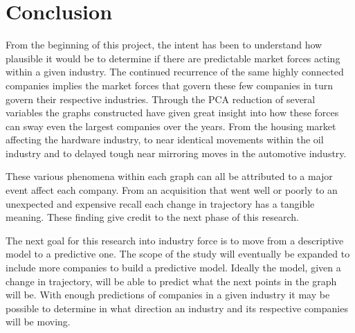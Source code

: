 \chapter{Conclusion}



	From the beginning of this project, the intent has been to understand how plausible it would be to determine if there are predictable market forces acting within a given industry. The continued recurrence of the same highly connected companies implies the market forces that govern these few companies in turn govern their respective industries. Through the PCA reduction of several variables the graphs constructed have given great insight into how these forces can sway even the largest companies over the years. From the housing market affecting the hardware industry, to near identical movements within the oil industry and to delayed tough near mirroring moves in the automotive industry.\\
\newline

	These various phenomena within each graph can all be attributed to a major event affect each company. From an acquisition that went well or poorly to an unexpected and expensive recall each change in trajectory has a tangible meaning. These finding give credit to the next phase of this research.\\
\newline

	The next goal for this research into industry force is to move from a descriptive model to a predictive one.  The scope of the study will eventually be expanded to include more companies to build a predictive model. Ideally the model, given a change in trajectory, will be able to predict what the next points in the graph will be. With enough predictions of companies in a given industry it may be possible to determine in what direction an industry and its respective companies will be moving.\\
\newline

